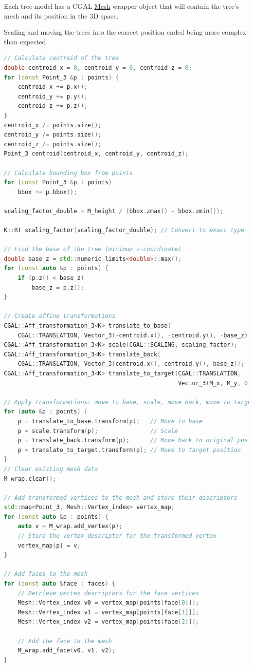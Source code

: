 \documentclass[12pt]{article}
\begin{document}
Each tree model has a CGAL \href{https://doc.cgal.org/latest/Surface_mesh/classCGAL_1_1Surface__mesh.html}{Mesh}
wrapper object that will contain the tree's
mesh and its position in the 3D space.

Scaling and moving the trees into the correct position ended being more complex
than expected. \\


\begin{lstlisting}[language=C++]
// Calculate centroid of the tree
double centroid_x = 0, centroid_y = 0, centroid_z = 0;
for (const Point_3 &p : points) {
    centroid_x += p.x();
    centroid_y += p.y();
    centroid_z += p.z();
}
centroid_x /= points.size();
centroid_y /= points.size();
centroid_z /= points.size();
Point_3 centroid(centroid_x, centroid_y, centroid_z);

// Calculate bounding box from points
for (const Point_3 &p : points)
    bbox += p.bbox();

scaling_factor_double = M_height / (bbox.zmax() - bbox.zmin());

K::RT scaling_factor(scaling_factor_double); // Convert to exact type

// Find the base of the tree (minimum z-coordinate)
double base_z = std::numeric_limits<double>::max();
for (const auto &p : points) {
    if (p.z() < base_z)
        base_z = p.z();
}

// Create affine transformations
CGAL::Aff_transformation_3<K> translate_to_base(
    CGAL::TRANSLATION, Vector_3(-centroid.x(), -centroid.y(), -base_z));
CGAL::Aff_transformation_3<K> scale(CGAL::SCALING, scaling_factor);
CGAL::Aff_transformation_3<K> translate_back(
    CGAL::TRANSLATION, Vector_3(centroid.x(), centroid.y(), base_z));
CGAL::Aff_transformation_3<K> translate_to_target(CGAL::TRANSLATION,
                                                  Vector_3(M_x, M_y, 0));

// Apply transformations: move to base, scale, move back, move to target
for (auto &p : points) {
    p = translate_to_base.transform(p);   // Move to base
    p = scale.transform(p);               // Scale
    p = translate_back.transform(p);      // Move back to original position
    p = translate_to_target.transform(p); // Move to target position
}
// Clear existing mesh data
M_wrap.clear();

// Add transformed vertices to the mesh and store their descriptors
std::map<Point_3, Mesh::Vertex_index> vertex_map;
for (const auto &p : points) {
    auto v = M_wrap.add_vertex(p);
    // Store the vertex descriptor for the transformed vertex
    vertex_map[p] = v;
}

// Add faces to the mesh
for (const auto &face : faces) {
    // Retrieve vertex descriptors for the face vertices
    Mesh::Vertex_index v0 = vertex_map[points[face[0]]];
    Mesh::Vertex_index v1 = vertex_map[points[face[1]]];
    Mesh::Vertex_index v2 = vertex_map[points[face[2]]];

    // Add the face to the mesh
    M_wrap.add_face(v0, v1, v2);
}
\end{lstlisting}
\end{document}

